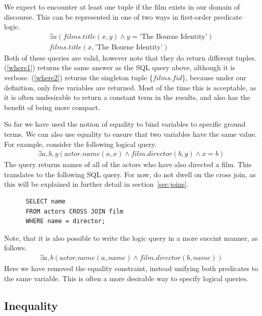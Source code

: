 \documentclass[a4paper, 11pt]{article}
\begin{document}
      We expect to encounter at least one tuple if the film exists in our domain
      of discourse.  This can be represented
      in one of two ways in first-order predicate logic.
      \begin{gather}
        \exists x(films.title(x, y) \land y = \text{'The Bourne
        Identity'})\label{where1}\\
        films.title(x, \text{'The Bourne Identity'})\label{where2}
      \end{gather}
      Both of these queries are valid, however note that they do return different
      tuples. (\ref{where1}) returns the same answer as the SQL query above, although
      it is verbose. (\ref{where2}) returns the singleton tuple \{$films.fid$\},
      because under our definition, only free variables are returned. Most of
      the time this is acceptable, as it is often undesirable to return a
      constant term in the results, and also has the benefit of being more
      compact.

      So far we have used the notion of equality to bind variables to specific
      ground terms. We can also use equality to ensure that two variables have
      the same value. For example, consider the following logical query.
      \begin{gather}
        \exists a,b,y(actor.name(a, x) \land film.director(b, y) \land x = b)
      \end{gather}
      The query returns names of all of the actors who have also directed a
      film. This translates to the following SQL query. For now, do not dwell
      on the cross join, as this will be explained in further detail in
      section~\ref{sec:joins}.

      \begin{verbatim}
      SELECT name
      FROM actors CROSS JOIN film
      WHERE name = director;
      \end{verbatim}

      Note, that it is also possible to write the logic query in a more succint
      manner, as follows.
      \begin{gather}
        \exists a,b(actor.name(a, name) \land film.director(b, name))
      \end{gather}
      Here we have removed the equality constraint, instead unifying both
      predicates to the same variable. This is often a more desirable way to
      specify logical queries.

    \subsection{Inequality}
\end{document}
